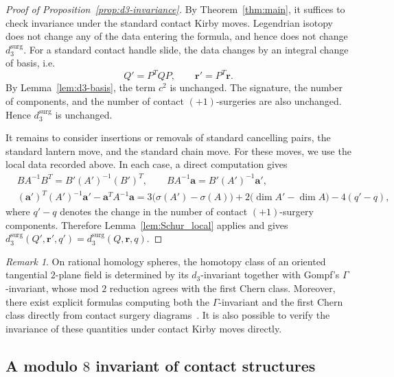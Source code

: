 \documentclass{amsart}
\numberwithin{equation}{section}
\numberwithin{figure}{section}
\theoremstyle{definition}
\theoremstyle{remark}
\newtheorem{remark}[theorem]{Remark}
\let\oldgamma\Gamma %
\renewcommand{\Gamma}{\oldgamma}
\begin{document}
\begin{proof}[Proof of Proposition~\ref{prop:d3-invariance}]
By Theorem~\ref{thm:main}, it suffices to check invariance under the standard contact Kirby moves.
Legendrian isotopy does not change any of the data entering the formula, and hence does not change \(d_3^{\mathrm{surg}}\).
For a standard contact handle slide, the data changes by an integral change of basis, i.e.\
\[
Q'=P^TQP,
\qquad
\boldsymbol r'=P^T\boldsymbol r.
\]
By Lemma~\ref{lem:d3-basis}, the term \(c^2\) is unchanged. The signature, the number of components, and the number of contact \((+1)\)-surgeries are also unchanged. Hence \(d_3^{\mathrm{surg}}\) is unchanged.

It remains to consider insertions or removals of standard cancelling pairs, the standard lantern move, and the standard chain move. For these moves, we use the local data recorded above. In each case, a direct computation gives
\begin{align*}
    &BA^{-1}B^T=B'(A')^{-1}(B')^T,
\qquad
BA^{-1}\boldsymbol a=B'(A')^{-1}\boldsymbol a',\\
&(\boldsymbol a')^T(A')^{-1}\boldsymbol a'
-
\boldsymbol a^TA^{-1}\boldsymbol a
=
3\bigl(\sigma(A')-\sigma(A)\bigr)
+
2\bigl(\operatorname{dim} A'-\operatorname{dim} A\bigr)
-
4(q'-q),
\end{align*}
where \(q'-q\) denotes the change in the number of contact \((+1)\)-surgery components. Therefore Lemma~\ref{lem:Schur_local} applies and gives $d_3^{\mathrm{surg}}(Q',\boldsymbol r',q')=d_3^{\mathrm{surg}}(Q,\boldsymbol r,q)$.
\end{proof}

\begin{remark}
    On rational homology spheres, the homotopy class of an oriented tangential \(2\)-plane field is determined by its \(d_3\)-invariant together with Gompf's \(\Gamma\)-invariant, whose mod \(2\) reduction agrees with the first Chern class. Moreover, there exist explicit formulas computing both the \(\Gamma\)-invariant and the first Chern class directly from contact surgery diagrams~\cite{Gompf,Ding_Geiges_Stipsicz,Etnyre_Kegel_Onaran}. It is also possible to verify the invariance of these quantities under contact Kirby moves directly.
\end{remark}

\subsection{A modulo \(8\) invariant of contact structures} 
\label{sec:mod8inv}
\end{document}
